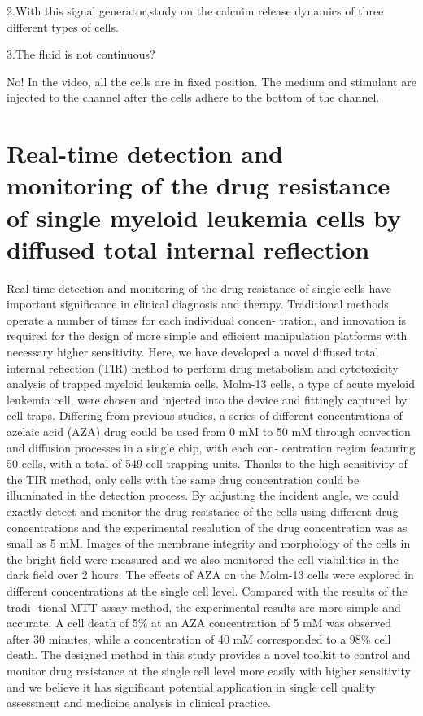 \documentclass{article}
\begin{document}
2.With this signal generator,study on the calcuim release dynamics of three different types of cells.


3.The fluid is not continuous? 

No! In the video, all the cells are in fixed position. The medium and stimulant are injected to the channel after the cells adhere to the bottom of the channel.  

\part{Real-time detection and monitoring of the drug resistance of single myeloid leukemia cells by diffused total internal reflection}


Real-time detection and monitoring of the drug resistance of single cells have important significance in clinical diagnosis and therapy. Traditional methods operate a number of times for each individual concen- tration, and innovation is required for the design of more simple and efficient manipulation platforms with necessary higher sensitivity. Here, we have developed a novel diffused total internal reflection (TIR) method to perform drug metabolism and cytotoxicity analysis of trapped myeloid leukemia cells. Molm-13 cells, a type of acute myeloid leukemia cell, were chosen and injected into the device and fittingly captured by cell traps. Differing from previous studies, a series of different concentrations of azelaic acid (AZA) drug could be used from 0 mM to 50 mM through convection and diffusion processes in a single chip, with each con- centration region featuring 50 cells, with a total of 549 cell trapping units. Thanks to the high sensitivity of the TIR method, only cells with the same drug concentration could be illuminated in the detection process. By adjusting the incident angle, we could exactly detect and monitor the drug resistance of the cells using different drug concentrations and the experimental resolution of the drug concentration was as small as 5 mM. Images of the membrane integrity and morphology of the cells in the bright field were measured and we also monitored the cell viabilities in the dark field over 2 hours. The effects of AZA on the Molm-13 cells were explored in different concentrations at the single cell level. Compared with the results of the tradi- tional MTT assay method, the experimental results are more simple and accurate. A cell death of 5\% at an AZA concentration of 5 mM was observed after 30 minutes, while a concentration of 40 mM corresponded to a 98\% cell death. The designed method in this study provides a novel toolkit to control and monitor drug resistance at the single cell level more easily with higher sensitivity and we believe it has significant potential application in single cell quality assessment and medicine analysis in clinical practice.
\end{document}
